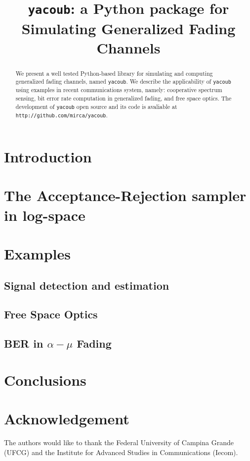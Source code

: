 \documentclass[conference, 10pt]{IEEEtran}
\begin{document}
\title{\texttt{yacoub}: a Python package for Simulating Generalized Fading Channels}

\author{
}

\maketitle

\begin{abstract}
    We present a well tested Python-based library for simulating and computing
    generalized fading channels, named \texttt{yacoub}. We describe the
    applicability of \texttt{yacoub} using examples in recent communications
    system, namely: cooperative spectrum sensing, bit error rate computation
    in generalized fading, and free space optics. The development of \texttt{yacoub}
    open source and its code is avaliable at \texttt{http://github.com/mirca/yacoub}.
\end{abstract}

\IEEEpeerreviewmaketitle
\section{Introduction}

\section{The Acceptance-Rejection sampler in log-space}

\section{Examples}
\subsection{Signal detection and estimation}
\subsection{Free Space Optics}
\subsection{BER in $\alpha-\mu$ Fading}

\section{Conclusions}


\section*{Acknowledgement}
The authors would like to thank the Federal University of Campina Grande (UFCG)
and the Institute for Advanced Studies in Communications (Iecom).



\end{document}

